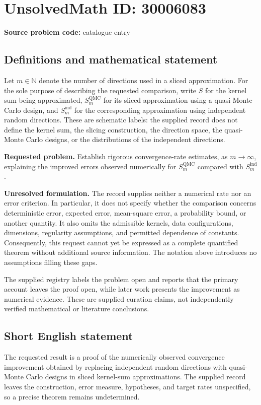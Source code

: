 \documentclass[11pt]{article}
\newcommand{\N}{\mathbb{N}}
\begin{document}
\section*{UnsolvedMath ID: 30006083}
\textbf{Source problem code:} catalogue entry
\subsection{Definitions and mathematical statement}
Let \(m\in\N\) denote the number of directions used in a sliced approximation. For the sole purpose of describing the requested comparison, write \(S\) for the kernel sum being approximated, \(S_m^{\mathrm{QMC}}\) for its sliced approximation using a quasi-Monte Carlo design, and \(S_m^{\mathrm{ind}}\) for the corresponding approximation using independent random directions. These are schematic labels: the supplied record does not define the kernel sum, the slicing construction, the direction space, the quasi-Monte Carlo designs, or the distributions of the independent directions.

\textbf{Requested problem.} Establish rigorous convergence-rate estimates, as \(m\to\infty\), explaining the improved errors observed numerically for \(S_m^{\mathrm{QMC}}\) compared with \(S_m^{\mathrm{ind}}\).

\textbf{Unresolved formulation.} The record supplies neither a numerical rate nor an error criterion. In particular, it does not specify whether the comparison concerns deterministic error, expected error, mean-square error, a probability bound, or another quantity. It also omits the admissible kernels, data configurations, dimensions, regularity assumptions, and permitted dependence of constants. Consequently, this request cannot yet be expressed as a complete quantified theorem without additional source information. The notation above introduces no assumptions filling these gaps.

The supplied registry labels the problem open and reports that the primary account leaves the proof open, while later work presents the improvement as numerical evidence. These are supplied curation claims, not independently verified mathematical or literature conclusions.
\subsection{Short English statement}
The requested result is a proof of the numerically observed convergence improvement obtained by replacing independent random directions with quasi-Monte Carlo designs in sliced kernel-sum approximations. The supplied record leaves the construction, error measure, hypotheses, and target rates unspecified, so a precise theorem remains undetermined.
\end{document}
